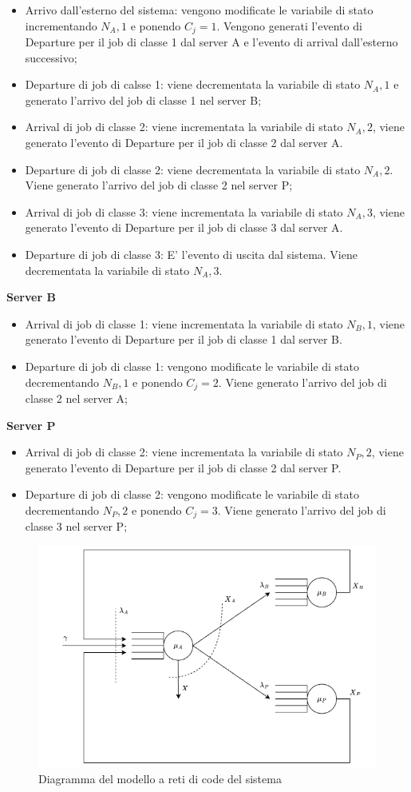 \begin{itemize}
    \item Arrivo dall'esterno del sistema: vengono modificate le variabile di stato incrementando $N_A,1$ e ponendo $C_j=1$. Vengono generati l'evento di Departure per il job di classe 1 dal server A e l'evento di arrival dall'esterno successivo;
    \item Departure di job di calsse 1: viene decrementata la variabile di stato $N_A,1$ e generato l'arrivo del job di classe 1 nel server B;
    \item Arrival di job di classe 2: viene incrementata la variabile di stato $N_A,2$, viene generato l'evento di Departure per il job di classe 2 dal server A.
    \item Departure di job di classe 2: viene decrementata la variabile di stato $N_A,2$. Viene generato l'arrivo del job di classe 2 nel server P;
    \item Arrival di job di classe 3: viene incrementata la variabile di stato $N_A,3$, viene generato l'evento di Departure per il job di classe 3 dal server A.
    \item Departure di job di classe 3: E' l'evento di uscita dal sistema. Viene decrementata la variabile di stato $N_A,3$.
\end{itemize}
\textbf{Server B}
\begin{itemize}
    \item Arrival di job di classe 1: viene incrementata la variabile di stato $N_B,1$, viene generato l'evento di Departure per il job di classe 1 dal server B.
    \item Departure di job di classe 1: vengono modificate le variabile di stato decrementando $N_B,1$ e ponendo $C_j=2$. Viene generato l'arrivo del job di classe 2 nel server A;
\end{itemize}
\textbf{Server P}
\begin{itemize}
    \item Arrival di job di classe 2: viene incrementata la variabile di stato $N_P,2$, viene generato l'evento di Departure per il job di classe 2 dal server P.
    \item Departure di job di classe 2: vengono modificate le variabile di stato decrementando $N_P,2$ e ponendo $C_j=3$. Viene generato l'arrivo del job di classe 3 nel server P;
\end{itemize}

\begin{figure}
    \centering
    \includegraphics[width=\linewidth]{figs/webapp_conceptual.drawio.png}
    \caption{Diagramma del modello a reti di code del sistema}
    \label{fig:queue_network_model}
\end{figure}